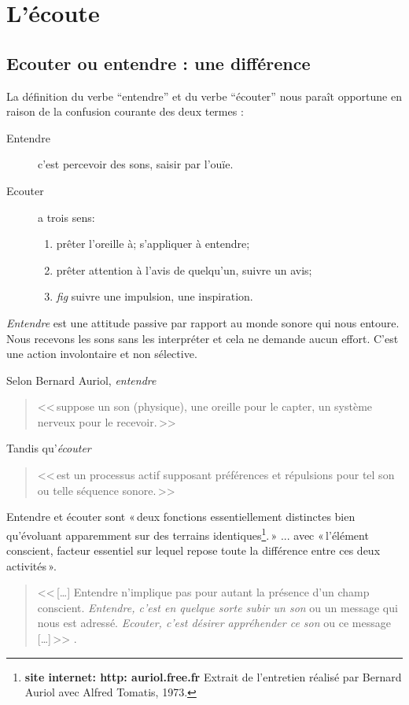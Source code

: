 \chapter{L'écoute}

\section{Ecouter ou entendre : une différence}

La définition du verbe ``entendre'' et du verbe ``écouter'' 
\autocite[p. 361-385]{hachette:dictionnaire} nous paraît opportune
en raison de la confusion courante des deux termes :
\begin{description}
\item[Entendre] c'est  percevoir des sons, saisir par l'ouïe.
\item[Ecouter] a trois sens: 
\begin{enumerate}
	\item prêter l'oreille à; s'appliquer à entendre;
	\item prêter attention à l'avis de quelqu'un, suivre un avis;
	\item \emph{fig} suivre une impulsion,	une inspiration.
\end{enumerate}
\end{description}



\emph{Entendre} est une attitude passive par rapport au monde sonore
qui nous entoure. Nous recevons les sons sans les interpréter et cela
ne demande aucun effort. C'est une action involontaire et non
sélective. 

Selon Bernard Auriol\autocite[p. 2, chap. 1]{auriol:cle}, \textit{entendre} 
\begin{quote}
	<<\,suppose un son (physique), une oreille
	pour le capter, un système nerveux pour le recevoir.\,>>
\end{quote} 
Tandis qu'\textit{écouter}
\begin{quote}
	<<\,est un
	processus actif supposant préférences et répulsions pour tel son ou
	telle séquence sonore.\,>>
\end{quote}


Entendre et écouter sont «\,deux
fonctions essentiellement distinctes bien qu'évoluant apparemment sur
des terrains identiques\footnote{\textbf{site internet: http: auriol.free.fr} Extrait de l'entretien réalisé par
	Bernard Auriol avec Alfred Tomatis, 1973.}.\,» ... avec «\,l'élément conscient, facteur essentiel sur lequel repose toute la
différence entre ces deux activités\,».
\begin{quote}
	
	<<\,[\ldots] Entendre n'implique pas pour autant la présence d'un champ
	conscient. \emph{Entendre, c'est en quelque sorte subir
		un son} ou un message qui nous est adressé. \emph{Ecouter, c'est désirer appréhender ce son} ou ce message [\ldots]\,>>
	\autocite{tomatis:education}.	
\end{quote}



